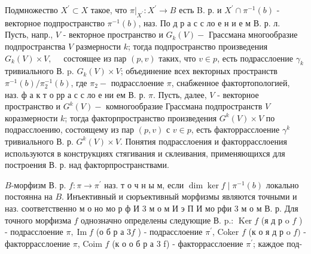 \documentclass[10pt]{article}
\begin{document}
Подмножество $X^{\prime} \subset X$ такое, что $\left.\pi\right|_{X^{\prime}}: X^{\prime} \rightarrow B$ есть B. р. и $X^{\prime} \cap \pi^{-1}(b)$ - векторное подпространство $\pi^{-1}(b)$, наз. По д р а с с ло е н и е м В. р. л. Пусть, напр., $V$ - векторное пространство и $G_{k}(V)-$ Грассмана многообразие подпространства $V$ размерности $k$; тогда подпространство произведения $G_{k}(V) \times V, \quad$ состоящее из пар $(p, v)$ таких, что $v \in p$, есть подрасслоение $\gamma_{k}$ тривиального В. p. $G_{k}(V) \times V$; объединение всех векторных пространств $\pi^{-1}(b) / \pi_{2}^{-1}(b)$, где $\pi_{2}-$ подрасслоение $\pi$, снабженное фактортопологией, наз. ф а к т о рр а с с ло е ни ем В. р. $\pi$. Пусть, далее, $V$ - векторное пространство и $G^{k}(V)-$ комногообразие Грассмана подпространств $V$ коразмерности $k$; тогда факторпространство произведения $G^{k}(V) \times V$ по подрасслоению, состоящему из пар $(p, v)$ с $v \in p$, есть факторрасслоение $\gamma^{k}$ тривиального В. р. $G^{k}(V) \times V$. Понятия подрасслоения и факторрасслоения используются в конструкциях стягивания и склеивания, применяющихся для построения В. р. над факторпространствами.



$B$-морфизм В. р. $f: \pi \rightarrow \pi^{\prime}$ наз. т о ч н ы м, если $\operatorname{dim} \operatorname{ker} f \mid \pi^{-1}(b)$ локально постоянна на $B$. Инъективный и сюръективный морфизмы являются точными и наз. соответственно м о но мо р ф И 3 м о м И э П И мо рфи 3 м о м В. р. Для точного морфизма $f$ однозначно определены следующие В. p.: $\operatorname{Ker} f$ (я д р o $f$ ) - подрасслоение $\pi, \operatorname{Im} f$ (о б р а $3 f$ ) - подрасслоение $\pi^{\prime}$, Coker $f$ (к о я д р o $f)$ - факторрасслоение $\pi$, Coim $f$ (к о о б р а 3 f) - факторрасслоение $\pi^{\prime}$; каждое под-
\end{document}
